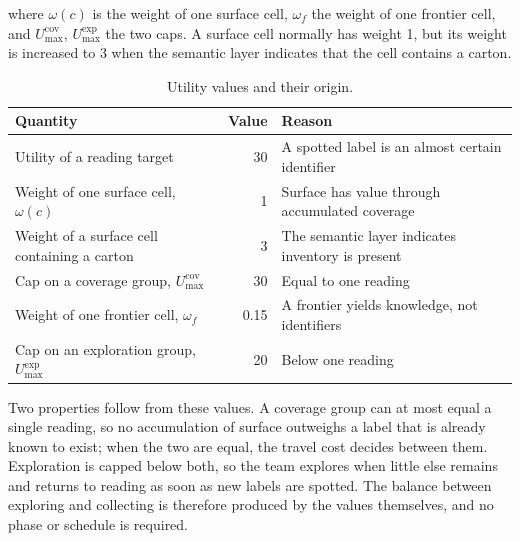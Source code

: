 where $\omega(c)$ is the weight of one surface cell, $\omega_f$ the weight of one
frontier cell, and $U_{\max}^{\text{cov}}$, $U_{\max}^{\text{exp}}$ the two caps.
A surface cell normally has weight 1, but its weight is increased to 3 when the
semantic layer indicates that the cell contains a carton.

\begin{table}[!htb]
    \centering
    \caption{Utility values and their origin.}%
    \label{tab:sys:utilities}
    \setlength{\tabcolsep}{4pt}
    \begin{tabular}{@{}>{\raggedright\arraybackslash}p{5.6cm}
            r
            >{\raggedright\arraybackslash}p{6.4cm}@{}}
        \toprule
        \textbf{Quantity}                                    & \textbf{Value} & \textbf{Reason}                                  \\
        \midrule
        Utility of a reading target                          & 30             & A spotted label is an almost certain identifier  \\
        \addlinespace
        Weight of one surface cell, $\omega(c)$              & 1              & Surface has value through accumulated coverage   \\
        \addlinespace
        Weight of a surface cell containing a carton         & 3              & The semantic layer indicates inventory is present \\
        \addlinespace
        Cap on a coverage group, $U_{\max}^{\text{cov}}$     & 30             & Equal to one reading                             \\
        \addlinespace
        Weight of one frontier cell, $\omega_f$              & 0.15           & A frontier yields knowledge, not identifiers     \\
        \addlinespace
        Cap on an exploration group, $U_{\max}^{\text{exp}}$ & 20             & Below one reading                                \\
        \bottomrule
    \end{tabular}
\end{table}

\FloatBarrier

Two properties follow from these values. A coverage group can at most equal a
single reading, so no accumulation of surface outweighs a label that is already
known to exist; when the two are equal, the travel cost decides between them.
Exploration is capped below both, so the team explores when little else remains
and returns to reading as soon as new labels are spotted. The balance between
exploring and collecting is therefore produced by the values themselves, and no
phase or schedule is required.

